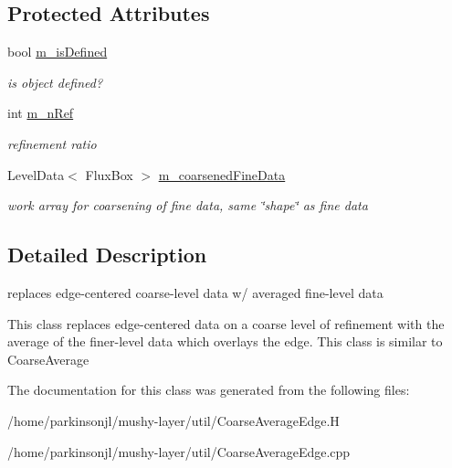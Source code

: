 \subsection*{Protected Attributes}
\begin{DoxyCompactItemize}
\item 
\hypertarget{class_coarse_average_edge_a4a9be01bec3331bb86caceb272a8e7ea}{bool \hyperlink{class_coarse_average_edge_a4a9be01bec3331bb86caceb272a8e7ea}{m\-\_\-is\-Defined}}\label{class_coarse_average_edge_a4a9be01bec3331bb86caceb272a8e7ea}

\begin{DoxyCompactList}\small\item\em is object defined? \end{DoxyCompactList}\item 
\hypertarget{class_coarse_average_edge_a3a1d2d45d28e7b8c06287c0f5cc5cdd6}{int \hyperlink{class_coarse_average_edge_a3a1d2d45d28e7b8c06287c0f5cc5cdd6}{m\-\_\-n\-Ref}}\label{class_coarse_average_edge_a3a1d2d45d28e7b8c06287c0f5cc5cdd6}

\begin{DoxyCompactList}\small\item\em refinement ratio \end{DoxyCompactList}\item 
\hypertarget{class_coarse_average_edge_a4a8c9e61ce976a3e28ec52bb8ff78a64}{Level\-Data$<$ Flux\-Box $>$ \hyperlink{class_coarse_average_edge_a4a8c9e61ce976a3e28ec52bb8ff78a64}{m\-\_\-coarsened\-Fine\-Data}}\label{class_coarse_average_edge_a4a8c9e61ce976a3e28ec52bb8ff78a64}

\begin{DoxyCompactList}\small\item\em work array for coarsening of fine data, same \char`\"{}shape\char`\"{} as fine data \end{DoxyCompactList}\end{DoxyCompactItemize}


\subsection{Detailed Description}
replaces edge-\/centered coarse-\/level data w/ averaged fine-\/level data 

This class replaces edge-\/centered data on a coarse level of refinement with the average of the finer-\/level data which overlays the edge. This class is similar to Coarse\-Average 

The documentation for this class was generated from the following files\-:\begin{DoxyCompactItemize}
\item 
/home/parkinsonjl/mushy-\/layer/util/Coarse\-Average\-Edge.\-H\item 
/home/parkinsonjl/mushy-\/layer/util/Coarse\-Average\-Edge.\-cpp\end{DoxyCompactItemize}
